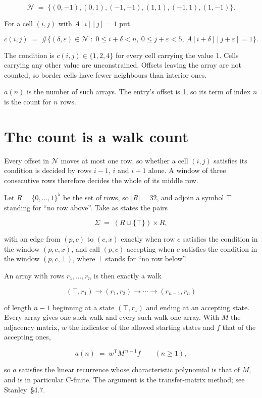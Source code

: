 \documentclass[11pt]{article}
\theoremstyle{definition}
\begin{document}
\[\mathcal{N} \;=\; \{(0,-1), (0,1), (-1,-1), (1,1), (-1,1), (1,-1)\}.\]

For a cell $(i,j)$ with $A[i][j] = 1$ put

\[c(i,j) \;=\; \#\bigl\{(\delta,\varepsilon)\in\mathcal{N} \;:\; 0\le i+\delta<n,\ 0\le j+\varepsilon<5,\ A[i+\delta][j+\varepsilon] = 1\bigr\}.\]

The condition is $c(i,j) \in \{1, 2, 4\}$ for every cell carrying the value 1. Cells carrying any other value are unconstrained. Offsets leaving the array are not counted, so border cells have fewer neighbours than interior ones.

$a(n)$ is the number of such arrays. The entry's offset is 1, so its term of index $n$ is the count for $n$ rows.

\section{The count is a walk count}

Every offset in $\mathcal{N}$ moves at most one row, so whether a cell $(i,j)$ satisfies its condition is decided by rows $i-1$, $i$ and $i+1$ alone. A window of three consecutive rows therefore decides the whole of its middle row.

Let $R = \{0,\dots,1\}^{5}$ be the set of rows, so $|R| = 32$, and adjoin a symbol $\top$ standing for ``no row above''. Take as states the pairs

\[\Sigma \;=\; (R \cup \{\top\}) \times R,\]

with an edge from $(p,c)$ to $(c,x)$ exactly when row $c$ satisfies the condition in the window $(p,c,x)$, and call $(p,c)$ accepting when $c$ satisfies the condition in the window $(p,c,\bot)$, where $\bot$ stands for ``no row below''.

An array with rows $r_1,\dots,r_n$ is then exactly a walk

\[(\top,r_1) \to (r_1,r_2) \to \cdots \to (r_{n-1},r_n)\]

of length $n-1$ beginning at a state $(\top,r_1)$ and ending at an accepting state. Every array gives one such walk and every such walk one array. With $M$ the adjacency matrix, $w$ the indicator of the allowed starting states and $f$ that of the accepting ones,

\[a(n) \;=\; w^{\mathsf T} M^{\,n-1} f \qquad (n \ge 1),\]

so $a$ satisfies the linear recurrence whose characteristic polynomial is that of $M$, and is in particular C-finite. The argument is the transfer-matrix method; see Stanley~\S4.7.
\end{document}
